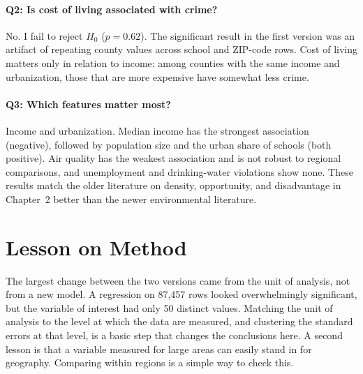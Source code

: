 \documentclass[12pt,letterpaper]{report}
\begin{document}
\paragraph{Q2: Is cost of living associated with crime?} No. I fail to reject $H_0$
($p=0.62$). The significant result in the first version was an artifact of repeating county
values across school and ZIP-code rows. Cost of living matters only in relation to income:
among counties with the same income and urbanization, those that are more expensive have
somewhat less crime.

\paragraph{Q3: Which features matter most?} Income and urbanization. Median income has the
strongest association (negative), followed by population size and the urban share of
schools (both positive). Air quality has the weakest association and is not robust to
regional comparisons, and unemployment and drinking-water violations show none. These results match the older
literature on density, opportunity, and disadvantage in Chapter~2 better than the newer
environmental literature.

\section{Lesson on Method}
The largest change between the two versions came from the unit of analysis, not from a new
model. A regression on 87,457 rows looked overwhelmingly significant, but the variable of
interest had only 50 distinct values. Matching the unit of analysis to the level at which the
data are measured, and clustering the standard errors at that level, is a basic step that
changes the conclusions here. A second lesson is that a variable measured for large areas can
easily stand in for geography. Comparing within regions is a simple way to check this.
\end{document}
